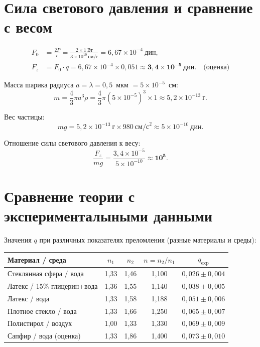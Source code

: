 \documentclass[a4paper]{article}
\begin{document}
\section*{Сила светового давления и сравнение с весом}

\begin{align*}
    F_0 &= \frac{2P}{c} = \frac{2 \times 1~\text{Вт}}{3 \times 10^{10}~\text{см/с}} = 6{,}67 \times 10^{-4}~\text{дин}, \\
    F_z &= F_0 \cdot q = 6{,}67 \times 10^{-4} \times 0{,}051 \approx \mathbf{3{,}4 \times 10^{-5}}~\text{дин}. \quad \text{(оценка)}
\end{align*}

Масса шарика радиуса $a = \lambda = 0{,}5$~мкм $= 5 \times 10^{-5}$~см:
\[
    m = \frac{4}{3}\pi a^3 \rho = \frac{4}{3}\pi (5 \times 10^{-5})^3 \times 1 \approx 5{,}2 \times 10^{-13}~\text{г}.
\]

Вес частицы:
\[
    mg = 5{,}2 \times 10^{-13}~\text{г} \times 980~\text{см/с}^2 \approx 5 \times 10^{-10}~\text{дин}.
\]

Отношение силы светового давления к весу:
\[
    \frac{F_z}{mg} = \frac{3{,}4 \times 10^{-5}}{5 \times 10^{-10}} \approx \mathbf{10^5}.
\]

\section{Сравнение теории с эксперименталыными данными}

Значения $q$ при различных показателях преломления (разные материалы и среды):

\begin{tabular}{lcccc}
\hline
Материал / среда & $n_1$ & $n_2$ & $n = n_2/n_1$ & $q_{\text{exp}}$ \\
\hline
Стеклянная сфера / вода & 1,33 & 1,46 & 1,100 & $0{,}026 \pm 0{,}004$ \\
Латекс / 15\% глицерин+вода & 1,36 & 1,55 & 1,140 & $0{,}038 \pm 0{,}005$ \\
Латекс / вода & 1,33 & 1,58 & 1,188 & $0{,}051 \pm 0{,}006$ \\
Плотное стекло / вода & 1,33 & 1,66 & 1,250 & $0{,}065 \pm 0{,}007$ \\
Полистирол / воздух & 1,00 & 1,33 & 1,330 & $0{,}069 \pm 0{,}009$ \\
Сапфир / вода (оценка) & 1,33 & 1,86 & 1,400 & $0{,}073 \pm 0{,}010$ \\
\hline
\end{tabular}
\end{document}
